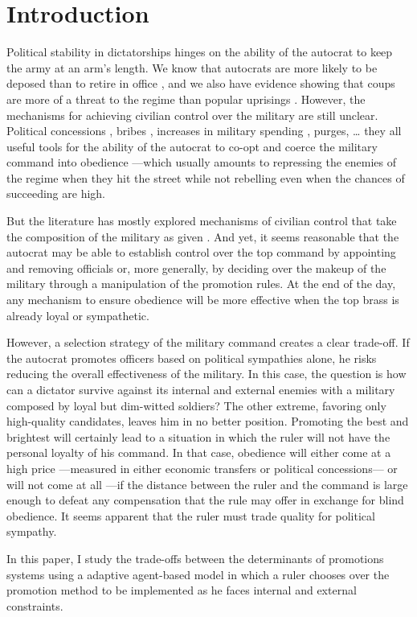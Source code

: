 \section{Introduction}

Political stability in dictatorships hinges on the ability of the autocrat to
keep the army at an arm's length. We know that autocrats are more likely to be
deposed than to retire in office \citep{escriba:2013}, and we also have evidence
showing that coups are more of a threat to the regime than popular uprisings
\citep{gandhi:2008}. However, the mechanisms for achieving civilian control over
the military are still unclear. Political concessions
\citep{leon:2009,svolik:2012a}, bribes \citep{goda:2000}, increases in military
spending \citep{rivero:2011}, purges, \dots{} they all useful tools for the
ability of the autocrat to co-opt and coerce \citep{gandhi:2007} the military
command into obedience ---which usually amounts to repressing the enemies of the
regime when they hit the street while not rebelling even when the chances of
succeeding are high.

But the literature has mostly explored mechanisms of civilian control that take
the composition of the military as given \citep{acemoglu:2010}. And yet, it
seems reasonable that the autocrat may be able to establish control over the top
command by appointing and removing officials or, more generally, by deciding
over the makeup of the military through a manipulation of the promotion rules.
At the end of the day, any mechanism to ensure obedience will be more effective
when the top brass is already loyal or sympathetic.

However, a selection strategy of the military command creates a clear trade-off.
If the autocrat promotes officers based on political sympathies alone, he risks
reducing the overall effectiveness of the military. In this case, the question
is how can a dictator survive against its internal and external enemies with a
military composed by loyal but dim-witted soldiers? The other extreme, favoring
only high-quality candidates, leaves him in no better position. Promoting the
best and brightest will certainly lead to a situation in which the ruler will
not have the personal loyalty of his command. In that case, obedience will
either come at a high price ---measured in either economic transfers or
political concessions--- or will not come at all ---if the distance between the
ruler and the command is large enough to defeat any compensation that the rule
may offer in exchange for blind obedience. It seems apparent that the ruler must
trade quality for political sympathy.

In this paper, I study the trade-offs between the determinants of promotions
systems using a adaptive agent-based model in which a ruler chooses over the
promotion method to be implemented as he faces internal and external
constraints.

